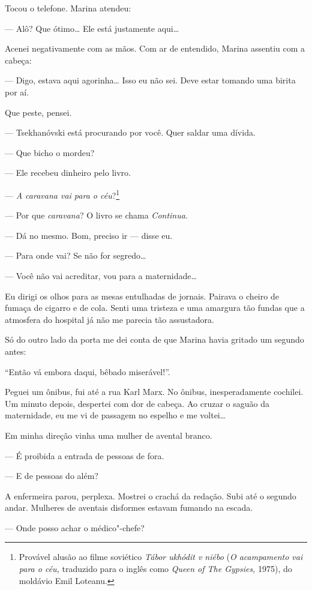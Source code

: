 Tocou o telefone. Marina atendeu:

--- Alô? Que ótimo\ldots{} Ele está justamente aqui\ldots{}

Acenei negativamente com as mãos. Com ar de entendido, Marina assentiu
com a cabeça:

--- Digo, estava aqui agorinha\ldots{} Isso eu não sei. Deve estar tomando
uma birita por aí.

Que peste, pensei.

--- Tsekhanóvski está procurando por você. Quer saldar uma dívida.

--- Que bicho o mordeu?

--- Ele recebeu dinheiro pelo livro.

--- \emph{A caravana vai para o céu}?\footnote{Provável alusão ao filme
  soviético \emph{Tábor ukhódit v niébo} (\emph{O acampamento vai para o
  céu,} traduzido para o inglês como \emph{Queen of The Gypsies,} 1975),
  do moldávio Emil Loteanu.}

--- Por que \emph{caravana}? O livro se chama \emph{Continua}.

--- Dá no mesmo. Bom, preciso ir --- disse eu.

--- Para onde vai? Se não for segredo\ldots{}

--- Você não vai acreditar, vou para a maternidade\ldots{}

Eu dirigi os olhos para as mesas entulhadas de jornais. Pairava o cheiro
de fumaça de cigarro e de cola. Senti uma tristeza e uma amargura tão
fundas que a atmosfera do hospital já não me parecia tão assustadora.

Só do outro lado da porta me dei conta de que Marina havia gritado um
segundo antes:

``Então vá embora daqui, bêbado miserável!''.

Peguei um ônibus, fui até a rua Karl Marx. No ônibus, inesperadamente
cochilei. Um minuto depois, despertei com dor de cabeça. Ao cruzar o
saguão da maternidade, eu me vi de passagem no espelho e me
voltei\ldots{}

Em minha direção vinha uma mulher de avental branco.

--- É proibida a entrada de pessoas de fora.

--- E de pessoas do além?

A enfermeira parou, perplexa. Mostrei o crachá da redação. Subi até o
segundo andar. Mulheres de aventais disformes estavam fumando na escada.

--- Onde posso achar o médico"-chefe?

